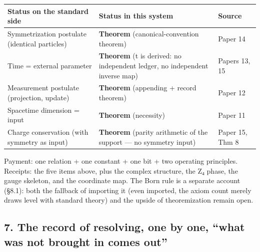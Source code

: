 \documentclass[
]{article}
\newcounter{none} %
\begin{document}
{\def\LTcaptype{none} %
\begin{longtable}[]{@{}
  >{\raggedright\arraybackslash}p{}
  >{\raggedright\arraybackslash}p{}
  >{\raggedright\arraybackslash}p{}@{}}
\toprule\noalign{}
\begin{minipage}[b]{\linewidth}\raggedright
Status on the standard side
\end{minipage} & \begin{minipage}[b]{\linewidth}\raggedright
Status in this system
\end{minipage} & \begin{minipage}[b]{\linewidth}\raggedright
Source
\end{minipage} \\
\midrule\noalign{}
\endhead
\bottomrule\noalign{}
\endlastfoot
Symmetrization postulate (identical particles) & \textbf{Theorem}
(canonical-convention theorem) & Paper 14 \\
Time = external parameter & \textbf{Theorem} (t is derived: no
independent ledger, no independent inverse map) & Papers 13, 15 \\
Measurement postulate (projection, update) & \textbf{Theorem} (appending
+ record theorem) & Paper 12 \\
Spacetime dimension = input & \textbf{Theorem} (necessity) & Paper 11 \\
Charge conservation (with symmetry as input) & \textbf{Theorem} (parity
arithmetic of the support --- no symmetry input) & Paper 15, Thm 8 \\
\end{longtable}
}

Payment: one relation + one constant + one bit + two operating
principles. Receipts: the five items above, plus the complex structure,
the Z₄ phase, the gauge skeleton, and the coordinate map. The Born rule
is a separate account (§8.1): both the fallback of importing it (even
imported, the axiom count merely draws level with standard theory) and
the upside of theoremization remain open.

\subsection{7. The record of resolving, one by one, ``what was not
brought in comes
out''}\label{the-record-of-resolving-one-by-one-what-was-not-brought-in-comes-out}
\end{document}
